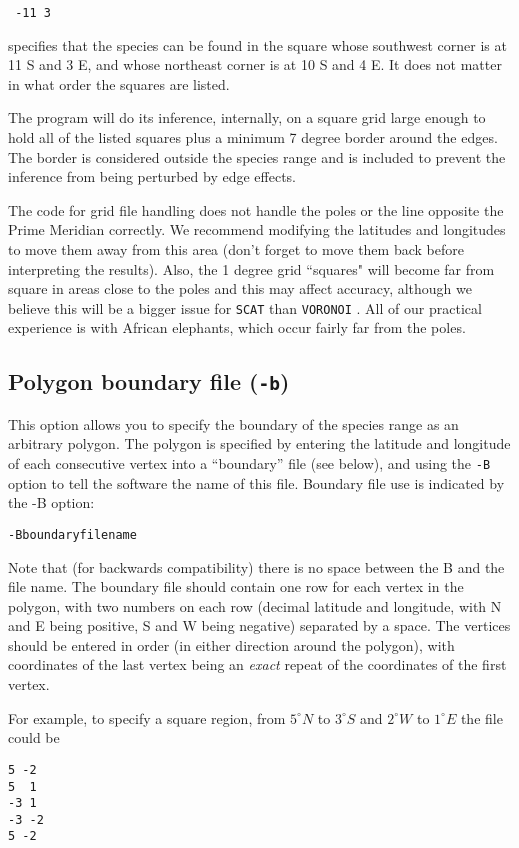 \documentclass[10pt,titlepage,times,letterpaper]{article}
\def\SCAT{{\tt SCAT} }
\def\VORONOI{{\tt VORONOI} }
\begin{document}
\medskip

{\noindent
{\tt
-11 3 \\
}}

specifies that the species can be found in the square whose southwest corner is at 11 S and 3 E,
and whose northeast corner is at 10 S and 4 E.  It does not matter in what order the squares are listed.

The program will do its inference, internally, on a square grid large enough to hold all of the
listed squares plus a minimum 7 degree border around the edges.   The border is considered 
outside the species range and is included to prevent the inference from being perturbed by
edge effects.

The code for grid file handling does not handle the poles or the line opposite the Prime 
Meridian 
correctly.  We recommend modifying the latitudes and longitudes to move them away from this 
area (don't forget to move them back before interpreting the results).  Also, the 1 degree 
grid ``squares" will become far from square in areas close to the poles and this may affect 
accuracy, although 
we believe this will be a bigger issue for \SCAT than \VORONOI.  All of our practical 
experience is with African elephants, which occur fairly far from the poles.

\subsection{Polygon boundary file ({\tt -b})}

This option allows you to specify the boundary of the species range as an arbitrary 
polygon.  The polygon is specified by entering the latitude and longitude of
each consecutive vertex into a ``boundary'' file (see below), and using
the {\tt -B} option to tell the software the name of this file.
Boundary file use is indicated by the -B option:

{\tt -Bboundaryfilename}

Note that (for backwards compatibility) there is no space between the B and the file name.
The boundary file should contain one row for each vertex in the
polygon, with two numbers on each row (decimal latitude and longitude,
with N and E being positive, S and W being negative) separated by a
space. The vertices should be entered in order (in either direction
around the polygon), with coordinates of the last vertex being an {\it
exact} repeat of the coordinates of the first vertex.

For example, to specify a square region, from $5^\circ N$ to $3^\circ S$ and
$2^\circ W$ to $1^\circ E$ the file could be
\begin{verbatim}
5 -2
5  1
-3 1
-3 -2
5 -2
\end{verbatim}
\end{document}
